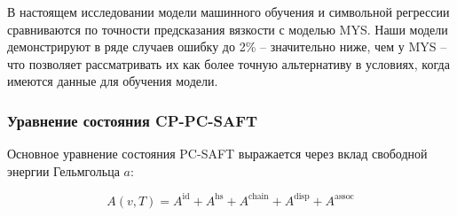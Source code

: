 \documentclass[a4paper,12pt]{article}
\begin{document}
      В настоящем исследовании модели машинного обучения и символьной регрессии сравниваются по точности предсказания вязкости с моделью MYS. Наши модели демонстрируют в ряде случаев ошибку до 2\% -- значительно ниже, чем у MYS -- что позволяет рассматривать их как более точную альтернативу в условиях, когда имеются данные для обучения модели.
      
    \subsubsection{Уравнение состояния CP-PC-SAFT}
    
    Основное уравнение состояния PC-SAFT выражается через вклад свободной энергии Гельмгольца \( a \):
    
    \begin{equation}
    A(v, T) = A^{\text{id}} + A^{\text{hs}} + A^{\text{chain}} + A^{\text{disp}} + A^{\text{assoc}}
    \end{equation}
    
\end{document}
